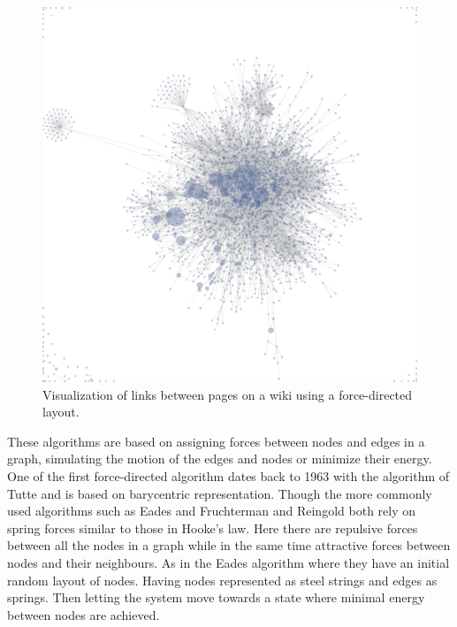 \documentclass[a4paper,11pt]{kth-mag}
\begin{document}
\begin{figure}[!htbp]
	\centering
	\includegraphics[scale=0.3]{ForceDirectedEx1}
	\caption{Visualization of links between pages on a wiki using a force-directed layout.}
	\label{fig:force_directed_ex1}
\end{figure}

These algorithms are based on assigning forces between nodes and edges in a graph, simulating the motion of the edges and nodes or minimize their energy. One of the first force-directed algorithm dates back to 1963 with 
the algorithm of Tutte\cite{tutteFD} and is based on barycentric representation\cite{1338}. Though the more commonly used algorithms such as Eades\cite{ead} and Fruchterman and Reingold\cite{fr} both rely on spring forces similar to those in
Hooke's law. Here there are repulsive forces between all the nodes in a graph while in the same time attractive forces between nodes and their neighbours. As in the Eades algorithm \cite{1338} where
they have an initial random layout of nodes. Having nodes represented as steel strings and edges as springs. Then letting the system move towards a state where minimal energy between 
nodes are achieved.
\end{document}
